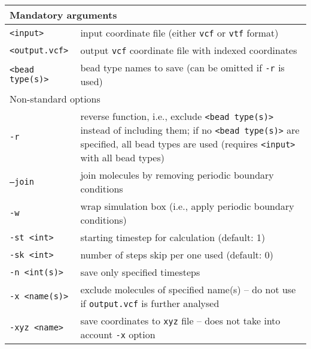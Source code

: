 \vspace{1em}
\noindent
\begin{longtable}{p{}p{}}
  \toprule
  \multicolumn{2}{l}{Mandatory arguments} \\
  \midrule
  \texttt{<input>} & input coordinate file (either \texttt{vcf} or
    \texttt{vtf} format) \\
  \texttt{<output.vcf>} & output \texttt{vcf} coordinate file with indexed
    coordinates \\
  \texttt{<bead type(s)>} & bead type names to save (can be omitted if
    \texttt{-r} is used) \\
  \toprule
  \multicolumn{2}{l}{Non-standard options} \\
  \midrule
  \texttt{-r} & reverse function, i.e., exclude \texttt{<bead type(s)>}
    instead of including them; if no \texttt{<bead type(s)>} are specified,
    all bead types are used (requires \texttt{<input>} with all bead types) \\
  \texttt{--join} & join molecules by removing periodic boundary conditions \\
  \texttt{-w} & wrap simulation box (i.e., apply periodic boundary conditions) \\
  \texttt{-st <int>} & starting timestep for calculation (default: 1) \\
  \texttt{-sk <int>} & number of steps skip per one used (default: 0) \\
  \texttt{-n <int(s)>} & save only specified timesteps \\
  \texttt{-x <name(s)>} & exclude molecules of specified name(s) -- do not
    use if \texttt{output.vcf} is further analysed \\
  \texttt{-xyz <name>} & save coordinates to \texttt{xyz} file -- does not
    take into account \texttt{-x} option \\
  \bottomrule
\end{longtable}

